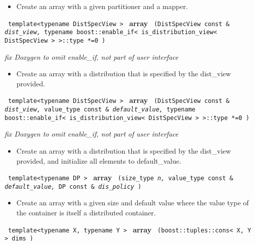 \begin{itemize}
\item
Create an array with a given partitioner and a mapper. 
\end{itemize}
 
\noindent
\texttt{%
template<typename DistSpecView >
}
\newline
\textbf{array}%
\texttt{%
(DistSpecView const \&
\textit{dist\_view,}%
typename boost::enable\_if< 
    is\_distribution\_view< DistSpecView > >::type *=0
)
}

\vspace{0.4cm} \emph{fix Doxygen to omit enable\_if, not part of user interface}

\begin{itemize}
\item
Create an array with a distribution that is specified by the dist\_view provided. 
\end{itemize}
 
\noindent
\texttt{%
template<typename DistSpecView >
}
\newline
\textbf{array}%
\texttt{%
(DistSpecView const \&
\textit{dist\_view,}%
value\_type const \&
\textit{default\_value,}%
typename boost::enable\_if< is\_distribution\_view< DistSpecView > >::type *=0
)
}

\vspace{0.4cm} \emph{fix Doxygen to omit enable\_if, not part of user interface}

\begin{itemize}
\item
Create an array with a distribution that is specified by the dist\_view provided, and initialize all elements to default\_value. 
\end{itemize}
 
\noindent
\texttt{%
template<typename DP >
}
\newline
\textbf{array}%
\texttt{%
(size\_type 
\textit{n,}%
value\_type const \&
\textit{default\_value,}%
DP const \&
\textit{dis\_policy}%
)
}

\begin{itemize}
\item
Create an array with a given size and default value where the value type of the container is itself a distributed container. 
\end{itemize}
 
\noindent
\texttt{%
template<typename X, typename Y >
}
\newline
\textbf{array}%
\texttt{%
(boost::tuples::cons< X, Y > dims
)
}

